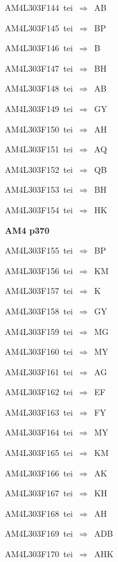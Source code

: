 {\sixrm AM4L303F144\ {\sixit tei}\ }$\Rightarrow$\ AB\par\smallskip
{\sixrm AM4L303F145\ {\sixit tei}\ }$\Rightarrow$\ BP\par\smallskip
{\sixrm AM4L303F146\ {\sixit tei}\ }$\Rightarrow$\ B\par\smallskip
{\sixrm AM4L303F147\ {\sixit tei}\ }$\Rightarrow$\ BH\par\smallskip
{\sixrm AM4L303F148\ {\sixit tei}\ }$\Rightarrow$\ AB\par\smallskip
{\sixrm AM4L303F149\ {\sixit tei}\ }$\Rightarrow$\ GY\par\smallskip
{\sixrm AM4L303F150\ {\sixit tei}\ }$\Rightarrow$\ AH\par\smallskip
{\sixrm AM4L303F151\ {\sixit tei}\ }$\Rightarrow$\ AQ\par\smallskip
{\sixrm AM4L303F152\ {\sixit tei}\ }$\Rightarrow$\ QB\par\smallskip
{\sixrm AM4L303F153\ {\sixit tei}\ }$\Rightarrow$\ BH\par\smallskip
{\sixrm AM4L303F154\ {\sixit tei}\ }$\Rightarrow$\ HK\par\smallskip

\par\vfill\eject
{\bf\hfill AM4 p370\hfill\hbox{}}\par\bigskip
{\sixrm AM4L303F155\ {\sixit tei}\ }$\Rightarrow$\ BP\par\smallskip
{\sixrm AM4L303F156\ {\sixit tei}\ }$\Rightarrow$\ KM\par\smallskip
{\sixrm AM4L303F157\ {\sixit tei}\ }$\Rightarrow$\ K\par\smallskip
{\sixrm AM4L303F158\ {\sixit tei}\ }$\Rightarrow$\ GY\par\smallskip
{\sixrm AM4L303F159\ {\sixit tei}\ }$\Rightarrow$\ MG\par\smallskip
{\sixrm AM4L303F160\ {\sixit tei}\ }$\Rightarrow$\ MY\par\smallskip
{\sixrm AM4L303F161\ {\sixit tei}\ }$\Rightarrow$\ AG\par\smallskip
{\sixrm AM4L303F162\ {\sixit tei}\ }$\Rightarrow$\ EF\par\smallskip
{\sixrm AM4L303F163\ {\sixit tei}\ }$\Rightarrow$\ FY\par\smallskip
{\sixrm AM4L303F164\ {\sixit tei}\ }$\Rightarrow$\ MY\par\smallskip
{\sixrm AM4L303F165\ {\sixit tei}\ }$\Rightarrow$\ KM\par\smallskip
{\sixrm AM4L303F166\ {\sixit tei}\ }$\Rightarrow$\ AK\par\smallskip
{\sixrm AM4L303F167\ {\sixit tei}\ }$\Rightarrow$\ KH\par\smallskip
{\sixrm AM4L303F168\ {\sixit tei}\ }$\Rightarrow$\ AH\par\smallskip
{\sixrm AM4L303F169\ {\sixit tei}\ }$\Rightarrow$\ ADB\par\smallskip
{\sixrm AM4L303F170\ {\sixit tei}\ }$\Rightarrow$\ AHK\par\smallskip

